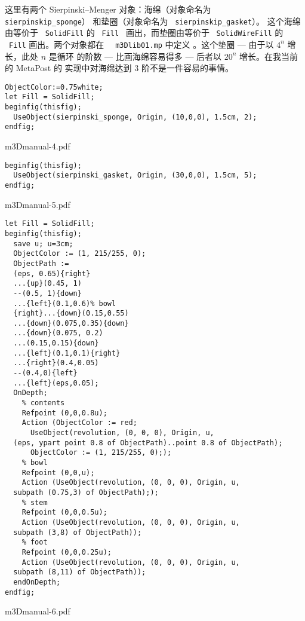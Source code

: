 \documentclass[a4paper,12pt]{article}
\begin{document}
这里有两个 Sierpinski--Menger 对象：海绵（对象命名为 ~{\tt
  sierpinskip\_sponge}） 和垫圈（对象命名为 ~{\tt sierpinskip\_gasket}）。 
这个海绵由等价于 ~{\tt SolidFill} 的 ~{\tt Fill } 画出，而垫圈由等价于
~{\tt SolidWireFill} 的 ~{\tt Fill} 画出。两个对象都在 ~{\tt
  m3Dlib01.mp} 中定义 。这个垫圈 --- 由于以 $4^{n}$ 增长，此处 $n$ 是循环
的阶数 --- 比画海绵容易得多 --- 后者以 $20^{n}$ 增长。在我当前的 MetaPost 的
实现中对海绵达到 3 阶不是一件容易的事情。 

\begin{verbatim}
ObjectColor:=0.75white;
let Fill = SolidFill;
beginfig(thisfig);
  UseObject(sierpinski_sponge, Origin, (10,0,0), 1.5cm, 2);
endfig;
\end{verbatim}
\centerline{\XeTeXpdffile m3Dmanual-4.pdf}

\begin{verbatim}
beginfig(thisfig);
  UseObject(sierpinski_gasket, Origin, (30,0,0), 1.5cm, 5);
endfig;
\end{verbatim}
\centerline{\XeTeXpdffile m3Dmanual-5.pdf}


\begin{verbatim}
let Fill = SolidFill;
beginfig(thisfig);
  save u; u=3cm;
  ObjectColor := (1, 215/255, 0);
  ObjectPath :=
  (eps, 0.65){right}
  ...{up}(0.45, 1)
  --(0.5, 1){down}
  ...{left}(0.1,0.6)% bowl
  {right}...{down}(0.15,0.55)
  ...{down}(0.075,0.35){down}
  ...{down}(0.075, 0.2)
  ...(0.15,0.15){down}
  ...{left}(0.1,0.1){right}
  ...{right}(0.4,0.05)
  --(0.4,0){left}
  ...{left}(eps,0.05);
  OnDepth;
    % contents
    Refpoint (0,0,0.8u);
    Action (ObjectColor := red;
      UseObject(revolution, (0, 0, 0), Origin, u,
  (eps, ypart point 0.8 of ObjectPath)..point 0.8 of ObjectPath);
      ObjectColor := (1, 215/255, 0););
    % bowl
    Refpoint (0,0,u);
    Action (UseObject(revolution, (0, 0, 0), Origin, u,
  subpath (0.75,3) of ObjectPath););
    % stem
    Refpoint (0,0,0.5u);
    Action (UseObject(revolution, (0, 0, 0), Origin, u,
  subpath (3,8) of ObjectPath));
    % foot
    Refpoint (0,0,0.25u);
    Action (UseObject(revolution, (0, 0, 0), Origin, u,
  subpath (8,11) of ObjectPath));
  endOnDepth;
endfig;
\end{verbatim}
\centerline{\XeTeXpdffile m3Dmanual-6.pdf}
\end{document}
